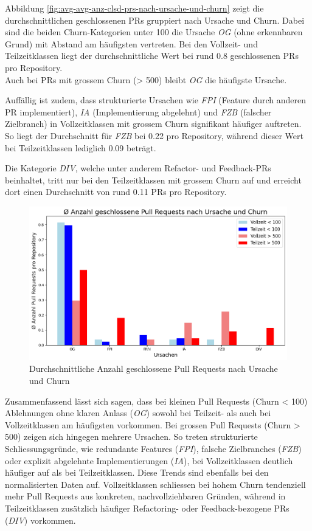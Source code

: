 Abbildung \autoref{fig:avg-avg-anz-clsd-prs-nach-ursache-und-churn} zeigt die durchschnittlichen geschlossenen PRs gruppiert nach Ursache und Churn. Dabei sind die beiden Churn-Kategorien unter 100 die Ursache \textit{OG} (ohne erkennbaren Grund) mit Abstand am häufigsten vertreten. Bei den Vollzeit- und Teilzeitklassen liegt der durchschnittliche Wert bei rund 0.8 geschlossenen PRs pro Repository. \\
Auch bei PRs mit grossem Churn (> 500) bleibt \textit{OG} die häufigste Ursache. 

Auffällig ist zudem, dass strukturierte Ursachen wie \textit{FPI} (Feature durch anderen PR implementiert), \textit{IA} (Implementierung abgelehnt) und \textit{FZB} (falscher Zielbranch) in Vollzeitklassen mit grossem Churn signifikant häufiger auftreten. So liegt der Durchschnitt für \textit{FZB} bei 0.22 pro Repository, während dieser Wert bei Teilzeitklassen lediglich 0.09 beträgt. 

Die Kategorie \textit{DIV}, welche unter anderem Refactor- und Feedback-PRs beinhaltet, tritt nur bei den Teilzeitklassen mit grossem Churn auf und erreicht dort einen Durchschnitt von rund 0.11 PRs pro Repository.
\begin{figure}[htbp]
    \includegraphics[width=\textwidth]{Figures/ursachenanalyse-pro-repo.png}
    \caption{Durchschnittliche Anzahl geschlossene Pull Requests nach Ursache und Churn}
    \label{fig:avg-avg-anz-clsd-prs-nach-ursache-und-churn}
\end{figure}



Zusammenfassend lässt sich sagen, dass bei kleinen Pull Requests (Churn < 100) Ablehnungen ohne klaren Anlass (\textit{OG}) sowohl bei Teilzeit- als auch bei Vollzeitklassen am häufigsten vorkommen. Bei grossen Pull Requests (Churn > 500) zeigen sich hingegen mehrere Ursachen. So treten strukturierte Schliessungsgründe, wie redundante Features (\textit{FPI}), falsche Zielbranches (\textit{FZB}) oder explizit abgelehnte Implementierungen (\textit{IA}), bei Vollzeitklassen deutlich häufiger auf als bei Teilzeitklassen. Diese Trends sind ebenfalls bei den normalisierten Daten auf. Vollzeitklassen schliessen bei hohem Churn tendenziell mehr Pull Requests aus konkreten, nachvollziehbaren Gründen, während in Teilzeitklassen zusätzlich häufiger Refactoring- oder Feedback-bezogene PRs (\textit{DIV}) vorkommen.

